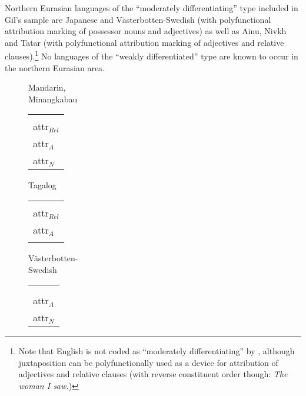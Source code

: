 Northern Eurasian languages of the “moderately differentiating” type included in Gil's sample are Japanese and Västerbotten-Swedish (with polyfunctional attribution marking of possessor nouns and adjectives) as well as Ainu, Nivkh and Tatar (with polyfunctional attribution marking of adjectives and relative clauses).\footnote{Note that English is not coded as “moderately differentiating” by \citet{gil2005}, although juxtaposition can be polyfunctionally used as a device for attribution of adjectives and relative clauses (with reverse constituent order though: \textit{The woman I saw.})} No languages of the “weakly differentiated” type are known to occur in the northern Eurasian area. 
\begin{figure} \label{multi abcd}
\parbox[b]{0.20\textwidth}{
\begin{center}{\sc Mandarin},\\{\sc Minangkabau}\\
\medskip
\begin{tabular}{| l |}
\hline
\\
\hline
\hline
\\
\hline
{\sc attr}$_{Rel}$\\
\hline
{\sc attr}$_{A}$\\
\hline
{\sc attr}$_{N}$\\
\hline
\end{tabular}
\end{center}
}
\parbox[b]{0.20\textwidth}{
\begin{center}{\sc Tagalog}\\
\bigskip
\begin{tabular}{| l |}
\hline
\\
\hline
\hline
\\
\hline
{\sc attr}$_{Rel}$\\
\hline
{\sc attr}$_{A}$\\
\hline
\\
\hline
\end{tabular}
\end{center}
}
\parbox[b]{0.20\textwidth}{
\begin{center}{\sc Västerbotten-}\\{\sc Swedish}\\
\medskip
\begin{tabular}{| l |}
\hline
\\
\hline
\hline
\\
\hline
\\
\hline
{\sc attr}$_{A}$\\
\hline
{\sc attr}$_{N}$\\

\end{tabular}
\end{center}}
\end{figure}
